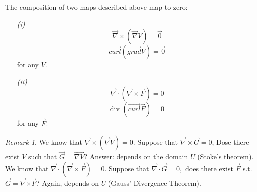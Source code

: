 \documentclass[12pt]{book}
\theoremstyle{definition}
\theoremstyle{remark}
\newtheorem*{remark}{Remark}
\begin{document}
  \begin{proposition} The composition of two maps described above map to zero:
\begin{enumerate}
  \item[\it (i)] $$\vec{{\nabla }} \times (\vec{\nabla} V) =  \vec{{0}} {}$$ 
    $$ \overrightarrow {{curl}} (\overrightarrow {{grad}} V) = \vec{{0}}  $$
    for any $V$.
  \item[\it (ii)] 
    $$\vec{{\nabla}}\cdot  (\vec{\nabla} \times \vec{{F}}  ) = 0
    $$
    $$\text{div }(\overrightarrow {{curl}} {\vec{{F}} }) = 0 $$
for any $\vec{{F}} .$

\end{enumerate}
        
  \end{proposition}
  \begin{remark} 
    We know that $\vec{{\nabla}} \times (\vec{{\nabla }} V) = 0$. Suppose that $\vec{{\nabla}} \times \vec{{G}} =0$, Dose there exist $V$ such that $\vec{{G}} = \vec{{\nabla V}}$? Answer: depends on the domain $U$ (Stoke's theorem). We know that $\vec{{\nabla}} \cdot (\vec{{\nabla}} \times \vec{{F}} ) = 0$. Suppose that $\vec{{\nabla}} {\cdot } \vec{{G}}  = 0, $ does there exist $\vec{{F}} $ s.t. $\vec{{G}} = \vec{{\nabla}} {\times \vec{{F}}}$? Again, depends on $U$ (Gauss' Divergence Theorem). 
  \end{remark}
\end{document}
